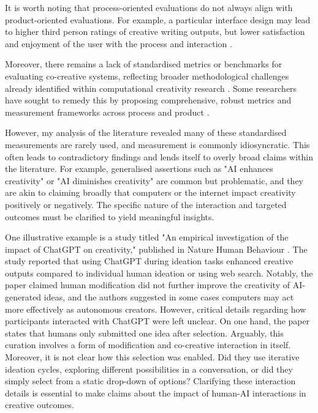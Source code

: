 It is worth noting that process-oriented evaluations do not always align with product-oriented evaluations. For example, a particular interface design may lead to higher third person ratings of creative writing outputs, but lower satisfaction and enjoyment of the user with the process and interaction \cite{Lee2022-rj}. 

Moreover, there remains a lack of standardised metrics or benchmarks for evaluating co-creative systems, reflecting broader methodological challenges already identified within computational creativity research \cite{Jordanous2012-kw}. Some researchers have sought to remedy this by proposing comprehensive, robust metrics and measurement frameworks across process and product \cite{Kantosalo2019-pz, Davis2016-te, Lawton2023-gd, Lee2022-rj}. 

However, my analysis of the literature revealed many of these standardised measurements are rarely used, and measurement is commonly idiosyncratic. This often leads to contradictory findings and lends itself to overly broad claims within the literature. For example, generalised assertions such as "AI enhances creativity" or "AI diminishes creativity" are common but problematic, and they are akin to claiming broadly that computers or the internet impact creativity positively or negatively. The specific nature of the interaction and targeted outcomes must be clarified to yield meaningful insights.

One illustrative example is a study titled "An empirical investigation of the impact of ChatGPT on creativity," published in Nature Human Behaviour \cite{Lee2024-vz}. The study reported that using ChatGPT during ideation tasks enhanced creative outputs compared to individual human ideation or using web search. Notably, the paper claimed human modification did not further improve the creativity of AI-generated ideas, and the authors suggested in some cases computers may act more effectively as autonomous creators. However, critical details regarding how participants interacted with ChatGPT were left unclear. On one hand, the paper states that humans only submitted one idea after selection. Arguably, this curation involves a form of modification and co-creative interaction in itself. Moreover, it is not clear how this selection was enabled. Did they use iterative ideation cycles, exploring different possibilities in a conversation, or did they simply select from a static drop-down of options? Clarifying these interaction details is essential to make claims about the impact of human-AI interactions in creative outcomes.

